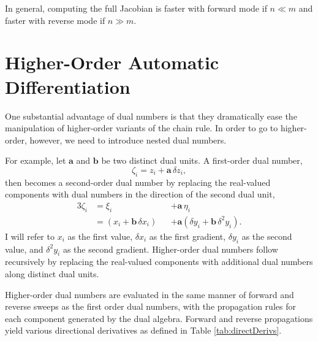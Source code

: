 In general, computing the full Jacobian is faster with forward mode if $n \ll m$ 
and faster with reverse mode if $n \gg m$.

\section*{Higher-Order Automatic Differentiation}

One substantial advantage of dual numbers is that they dramatically ease the
manipulation of higher-order variants of the chain rule.  In order to go to 
higher-order, however, we need to introduce nested dual numbers.

For example, let $\mathbf{a}$ and $\mathbf{b}$ be two distinct dual units.
A first-order dual number,
%
\begin{equation*}
\zeta_{i} = z_{i} + \mathbf{a} \, \delta z_{i},
\end{equation*}
%
then becomes a second-order dual number by replacing the 
real-valued components with dual numbers in the direction of the second 
dual unit,
%
\begin{alignat*}{3}
\zeta_{i} 
&=
\xi_{i} 
&&+ \mathbf{a} \, \eta_{i}
\\
&=
\left( x_{i} + \mathbf{b} \, \delta x_{i} \right)
&&+ \mathbf{a} \left( \delta y_{i} + \mathbf{b} \, \delta^{2} y_{i} \right).
\end{alignat*}
%
I will refer to $x_{i}$ as the first value, $\delta x_{i}$ as the first gradient, 
$\delta y_{i}$ as the second value, and $\delta^{2} y_{i}$
as the second gradient.  Higher-order dual numbers follow recursively 
by replacing the real-valued components with additional dual numbers along 
distinct dual units.

Higher-order dual numbers are evaluated in the same manner of forward and 
reverse sweeps as the first order dual numbers, with the propagation rules
for each component generated by the dual algebra.  Forward and reverse
propagations yield various directional derivatives as defined in Table \ref{tab:directDerivs}.

